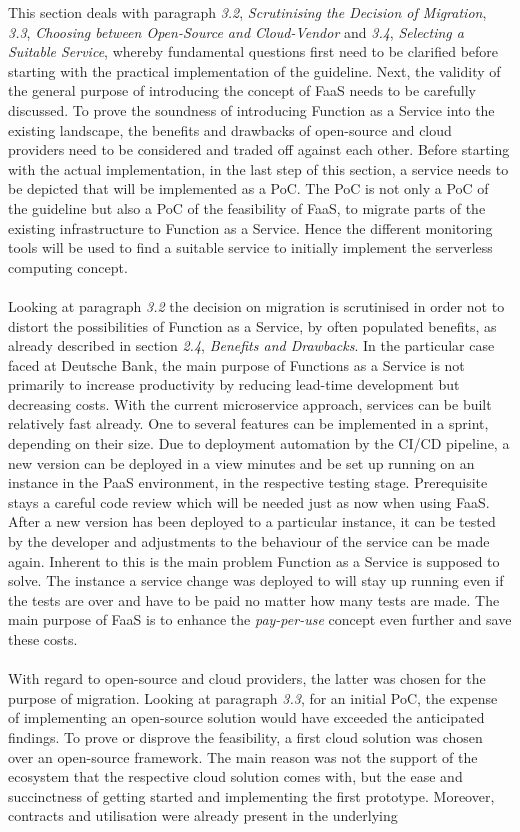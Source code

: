 \documentclass[a4paper,twoside,11pt, pagesize]{scrartcl}
\begin{document}
\begin{spacing}{1.2}
This section deals with paragraph \textit{3.2}, \textit{Scrutinising the Decision of Migration}, \textit{3.3}, \textit{Choosing between Open-Source and Cloud-Vendor} and \textit{3.4}, \textit{Selecting a Suitable Service}, whereby fundamental questions first need to be clarified before starting with the practical implementation of the guideline. Next, the validity of the general purpose of introducing the concept of FaaS needs to be carefully discussed. To prove the soundness of introducing Function as a Service into the existing landscape, the benefits and drawbacks of open-source and cloud providers need to be considered and traded off against each other. Before starting with the actual implementation, in the last step of this section, a service needs to be depicted that will be implemented as a PoC. The PoC is not only a PoC of the guideline but also a PoC of the feasibility of FaaS,  to migrate parts of the existing infrastructure to Function as a Service. Hence the different monitoring tools will be used to find a suitable service to initially implement the serverless computing concept. \\\\Looking at paragraph \textit{3.2} the decision on migration is scrutinised in order not to distort the possibilities of Function as a Service, by often populated benefits, as already described in section \textit{2.4}, \textit{Benefits and Drawbacks}. In the particular case faced at Deutsche Bank, the main purpose of Functions as a Service is not primarily to increase productivity by reducing lead-time development but decreasing costs. With the current microservice approach, services can be built relatively fast already. One to several features can be implemented in a sprint, depending on their size. Due to deployment automation by the CI/CD pipeline, a new version can be deployed in a view minutes and be set up running on an instance in the PaaS environment, in the respective testing stage. Prerequisite stays a careful code review which will be needed just as now when using FaaS. After a new version has been deployed to a particular instance, it can be tested by the developer and adjustments to the behaviour of the service can be made again. Inherent to this is the main problem Function as a Service is supposed to solve. The instance a service change was deployed to will stay up running even if the tests are over and have to be paid no matter how many tests are made. The main purpose of FaaS is to enhance the \textit{pay-per-use} concept even further and save these costs.\\\\ With regard to open-source and cloud providers, the latter was chosen for the purpose of migration. Looking at paragraph \textit{3.3}, for an initial PoC, the expense of implementing an open-source solution would have exceeded the anticipated findings. To prove or disprove the feasibility, a first cloud solution was chosen over an open-source framework. The main reason was not the support of the ecosystem that the respective cloud solution comes with, but the ease and succinctness of getting started and implementing the first prototype. Moreover, contracts and utilisation were already present in the underlying 
\end{spacing}
\end{document}
